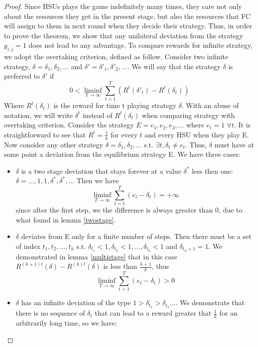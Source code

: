 \documentclass[letterpaper, 10 pt, conference]{ieeeconf}  %
\begin{document}
\begin{proof}
Since HSUs plays the game indefinitely many times, they care not only about the resources they get in the present stage, but also the resources that FC will assign to them in next round when they decide their strategy. Thus, in order to prove the theorem, we show that any unilateral deviation from the strategy $g_{i,j}=1$ does not lead to any advantage. To compare rewards for infinite strategy, we adopt the overtaking criterion\cite{rub}, defined as follow.
Consider two infinite strategy, $\delta=\delta_1,\delta_2,\dots$ and $\delta'=\delta'_1,\delta'_2,\dots$. We will say that the strategy $\delta$ is preferred to $\delta'$ if
\begin{equation}
0<\liminf_{T \to \infty}\sum\limits_{t=1}^T(R^t(\delta'_t)-R^t(\delta_t))
\end{equation}
Where $R^t(\delta_t)$ is the reward for time t playing strategy $\delta$. With an abuse of notation, we will write $\delta^t$ instead of $R^t(\delta_t)$ when comparing strategy with overtaking criterion.
Consider the strategy $E=e_1,e_2,e_3,\dots$ where $e_t=1$ $\forall t$. It is straightforward to see that $R^t=\frac{1}{k}$ for every $t$ and every HSU when they play E. Now consider any other strategy $\delta=\delta_1,\delta_2,\dots$ s.t. $\exists t, \delta_t\neq e_t$.  Thus, $\delta$ must have at some point a deviation from the equilibrium strategy E. We have three cases:
\begin{itemize}
\item {$\delta$ is a two stage deviation that stays forever at a value $\delta^*$ less then one: $\delta=\dots,1,1,\delta^*,\delta^*,\dots$ Then we have
\begin{equation}
\liminf_{T \to \infty}\sum\limits_{t=1}^T(e_t-\delta_t)=+\infty
\end{equation} since after the first step, we the difference is always greater than 0, due to what found in lemma \ref{twostage}.} 
\item{$\delta$ deviates from E only for a finite number of steps. Then there must be a set of index $t_1,t_2,\dots,t_h$ s.t. $\delta_{t_1}<1,\delta_{t_2}<1,\dots,\delta_{t_h}<1$ and $\delta_{t_h+1}=1$. We demonstrated in lemma \ref{multistage} that in this case  $R^{(h+1)t}(\delta)-R^{(h)t}(\delta)$ is less than $\frac{h+1}{k}$, thus
\begin{equation}
\liminf_{T \to \infty}\sum\limits_{t=1}^T(e_t-\delta_t)>0
\end{equation}
}
\item{$\delta$ has an infinite deviation of the type $1>\delta_{t_1}>\delta_{t_2}\dots$. We demonstrate that there is no sequence of $\delta_t$ that can lead to a reward greater that $\frac{1}{k}$ for an arbitrarily long time, so we have:
}
\end{itemize}
\end{proof}
\end{document}
